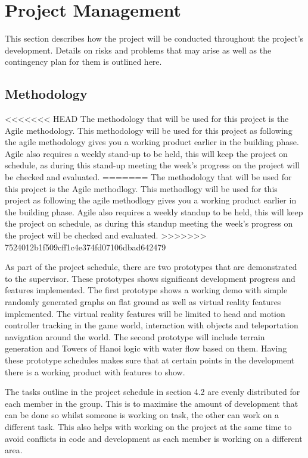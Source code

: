 \chapter{Project Management}
\label{chapter4}

This section describes how the project will be conducted throughout the project's development. Details on risks and problems that may arise as well as the contingency plan for them is outlined here.

\section{Methodology}
<<<<<<< HEAD
The methodology that will be used for this project is the Agile methodology. This methodology will be used for this project as following the agile methodology gives you a working product earlier in the building phase. Agile also requires a weekly stand-up to be held, this will keep the project on schedule, as during this stand-up meeting the week's progress on the project will be checked and evaluated.  
=======
The methodology that will be used for this project is the Agile methodlogy. This methodlogy will be used for this project as following the agile methodlogy gives you a working product earlier in the building phase. Agile also requires a weekly standup to be held, this will keep the project on schedule, as during this standup meeting the week's progress on the project will be checked and evaluated.  
>>>>>>> 7524012b1f509cff1c4e374fd07106dbad642479
\newline
\par
As part of the project schedule, there are two prototypes that are demonstrated to the supervisor. These prototypes shows significant development progress and features implemented. The first prototype shows a working demo with simple randomly generated graphs on flat ground as well as virtual reality features implemented. The virtual reality features will be limited to head and motion controller tracking in the game world, interaction with objects and teleportation navigation around the world. The second prototype will include terrain generation and Towers of Hanoi logic with water flow based on them. Having these prototype schedules makes sure that at certain points in the development there is a working product with features to show.
\newline
\par
The tasks outline in the project schedule in section 4.2 are evenly distributed for each member in the group. This is to maximise the amount of development that can be done so whilst someone is working on task, the other can work on a different task. This also helps with working on the project at the same time to avoid conflicts in code and development as each member is working on a different area.
\clearpage
